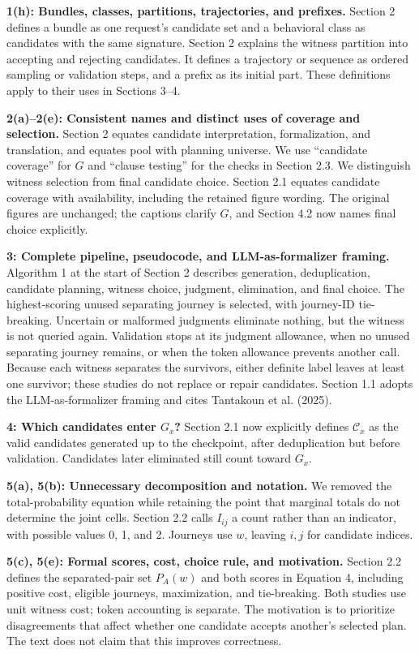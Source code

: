 \documentclass[11pt,a4paper]{scrartcl}
\begin{document}
\textbf{1(h): Bundles, classes, partitions, trajectories, and prefixes.}
Section 2 defines a bundle as one request's candidate set and a behavioral class as candidates with the same signature. Section 2 explains the witness partition into accepting and rejecting candidates. It defines a trajectory or sequence as ordered sampling or validation steps, and a prefix as its initial part. These definitions apply to their uses in Sections 3--4.

\textbf{2(a)--2(e): Consistent names and distinct uses of coverage and selection.}
Section 2 equates candidate interpretation, formalization, and translation, and equates pool with planning universe. We use ``candidate coverage'' for $G$ and ``clause testing'' for the checks in Section 2.3. We distinguish witness selection from final candidate choice. Section 2.1 equates candidate coverage with availability, including the retained figure wording. The original figures are unchanged; the captions clarify $G$, and Section 4.2 now names final choice explicitly.

\textbf{3: Complete pipeline, pseudocode, and LLM-as-formalizer framing.}
Algorithm 1 at the start of Section 2 describes generation, deduplication, candidate planning, witness choice, judgment, elimination, and final choice. The highest-scoring unused separating journey is selected, with journey-ID tie-breaking. Uncertain or malformed judgments eliminate nothing, but the witness is not queried again. Validation stops at its judgment allowance, when no unused separating journey remains, or when the token allowance prevents another call. Because each witness separates the survivors, either definite label leaves at least one survivor; these studies do not replace or repair candidates. Section 1.1 adopts the LLM-as-formalizer framing and cites Tantakoun et al. (2025).

\newpage
\textbf{4: Which candidates enter $G_x$?}
Section 2.1 now explicitly defines $\mathcal C_x$ as the valid candidates generated up to the checkpoint, after deduplication but before validation. Candidates later eliminated still count toward $G_x$.

\textbf{5(a), 5(b): Unnecessary decomposition and notation.}
We removed the total-probability equation while retaining the point that marginal totals do not determine the joint cells. Section 2.2 calls $I_{ij}$ a count rather than an indicator, with possible values 0, 1, and 2. Journeys use $w$, leaving $i,j$ for candidate indices.

\textbf{5(c), 5(e): Formal scores, cost, choice rule, and motivation.}
Section 2.2 defines the separated-pair set $P_A(w)$ and both scores in Equation 4, including positive cost, eligible journeys, maximization, and tie-breaking. Both studies use unit witness cost; token accounting is separate. The motivation is to prioritize disagreements that affect whether one candidate accepts another's selected plan. The text does not claim that this improves correctness.
\end{document}
